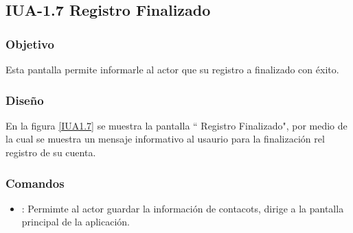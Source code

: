 \subsection{IUA-1.7 Registro Finalizado}

\subsubsection{Objetivo}

	
 Esta pantalla permite informarle al actor que su registro a finalizado con éxito.

\subsubsection{Diseño}


    En la figura \ref{IUA1.7} se muestra la pantalla `` Registro Finalizado", por medio de la cual se muestra un mensaje informativo al usaurio para la finalización rel registro de su cuenta. 

    

   

\subsubsection{Comandos}
    \begin{itemize}
    	\item {}: Permimte al actor guardar la información de contacots, dirige a la pantalla principal de la aplicación.
        
    \end{itemize}